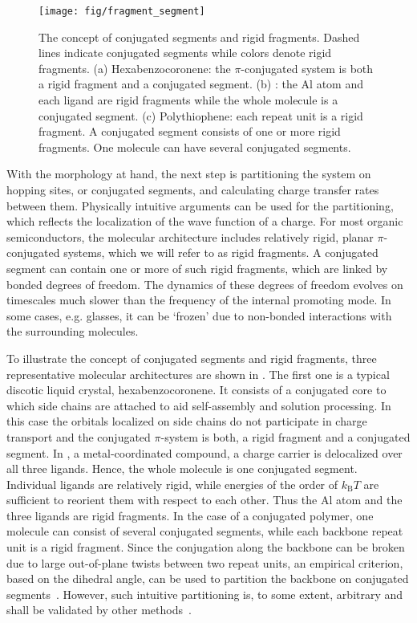 \begin{figure}
\texttt{[image: fig/fragment\_segment]}
\caption{The concept of conjugated segments and rigid fragments. Dashed lines indicate conjugated segments while colors denote rigid fragments. (a) Hexabenzocoronene: the $\pi$-conjugated system is both a rigid fragment and a conjugated segment. (b) \Alq: the Al atom and each ligand are rigid fragments while the whole molecule is a conjugated segment. (c) Polythiophene: each repeat unit is a rigid fragment. A conjugated segment consists of one or more rigid fragments. One molecule can have several conjugated segments.}
\label{fig:segment}
\end{figure}

With the morphology at hand, the next step is partitioning the system on hopping sites, or conjugated segments, and calculating charge transfer rates between them. Physically intuitive arguments can be used for the partitioning,  which reflects the localization of the wave function of a charge. For most organic semiconductors, the molecular architecture includes relatively rigid, planar $\pi$-conjugated systems, which we will refer to as rigid fragments. A conjugated segment can contain one or more of such rigid fragments, which are linked by bonded degrees of freedom. The dynamics of these degrees of freedom evolves on timescales much slower than the frequency of the internal promoting mode. In some cases, e.g. glasses, it can be `frozen' due to non-bonded interactions with the surrounding molecules.

To illustrate the concept of conjugated segments and rigid fragments, three representative molecular architectures are shown in . The first one is a typical discotic liquid crystal, hexabenzocoronene. It consists of a conjugated core to which side chains are attached to aid self-assembly and solution processing. In this case the orbitals localized on side chains do not participate in charge transport and the conjugated $\pi$-system is both, a rigid fragment and a conjugated segment. 
%
In \Alq, a metal-coordinated compound, a charge carrier is delocalized over all three ligands. Hence, the whole molecule is one conjugated segment. Individual ligands are relatively rigid, while energies of the order of $k_\text{B}T$ are sufficient to reorient them with respect to each other. Thus the Al atom and the three ligands are rigid fragments.
%
In the case of a conjugated polymer, one molecule can consist of several conjugated segments, while each backbone repeat unit is a rigid fragment. Since the conjugation along the backbone can be broken due to large out-of-plane twists between two repeat units, an empirical criterion, based on the dihedral angle, can be used to partition the backbone on conjugated segments~\cite{ruhle_multiscale_2010}. However, such intuitive partitioning is, to some extent, arbitrary and shall be validated by other methods~\cite{vukmirovic_charge_2008,vukmirovic_charge_2009,mcmahon_ad_2009}. 

